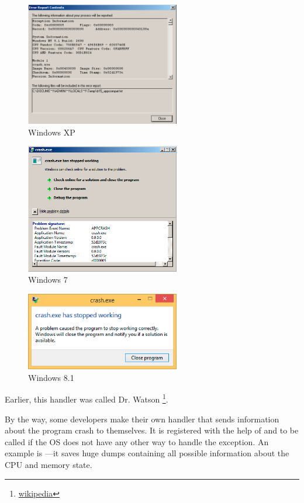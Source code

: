 \begin{figure}[H]
\centering
\includegraphics[width=0.6\textwidth]{OS/SEH/1/crash_xp2.png}
\caption{Windows XP}
\end{figure}

\begin{figure}[H]
\centering
\includegraphics[width=0.6\textwidth]{OS/SEH/1/crash_win7.png}
\caption{Windows 7}
\end{figure}

\begin{figure}[H]
\centering
\includegraphics[width=0.6\textwidth]{OS/SEH/1/crash_win81.png}
\caption{Windows 8.1}
\end{figure}

Earlier, this handler was called Dr. Watson
\footnote{\href{http://go.yurichev.com/17046}{wikipedia}}.

By the way, some developers make their own handler that sends information about the program crash to themselves.
It is registered with the help of  
and to be called if the \ac{OS} does not have any other way to handle the exception.
\myindex{\oracle}
An example is \oracle---it saves huge dumps containing all possible information about the \ac{CPU} and memory state.

